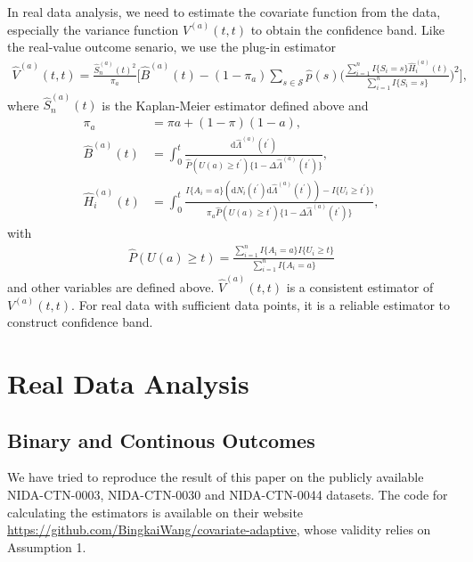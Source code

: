 \documentclass{article}
\begin{document}
In real data analysis, we need to estimate the covariate function from the data, especially the variance function $V^{(a)}(t,t)$ to obtain the confidence band. Like the real-value outcome senario, we use the plug-in estimator
\begin{align}
    \hat{V}^{(a)}(t,t)=\frac{\hat{S}_{n}^{(a)}(t)^2}{\pi_a}\Bigg[\hat{B}^{(a)}(t)-(1-\pi_a)\sum_{s\in\mathcal{S}}\hat{p}(s)\bigg(\frac{\sum_{i=1}^{n}I\{S_i=s\}\hat{H}_i^{(a)}(t)}{\sum_{i=1}^{n}I\{S_i=s\}}\bigg)^2\Bigg],\nonumber
\end{align}
where $\hat{S}_{n}^{(a)}(t)$ is the Kaplan-Meier estimator defined above and 
\begin{align}
    \pi_a&=\pi a + (1-\pi)(1-a),\nonumber\\
    \hat{B}^{(a)}(t)&=\int_{0}^{t}\frac{\mathrm{d}\hat{\Lambda}^{(a)}(t^{\prime})}{\hat{P}(U(a)\geq t^{\prime})\{1-\Delta\hat{\Lambda}^{(a)}(t^{\prime})\}},\nonumber\\
    \hat{H}_{i}^{(a)}(t)&=\int_{0}^{t}\frac{I\{A_i=a\}(\mathrm{d}N_i(t^{\prime})\mathrm{d}\hat{\Lambda}^{(a)}(t^{\prime}))-I\{U_i\geq t^{\prime}\})}{\pi_a\hat{P}(U(a)\geq t^{\prime})\{1-\Delta\hat{\Lambda}^{(a)}(t^{\prime})\}},\nonumber
\end{align}
with 
\begin{align}
    \hat{P}(U(a)\geq t) = \frac{\sum_{i=1}^{n}I\{A_i=a\}I\{U_i\geq t\}}{\sum_{i=1}^{n}I\{A_i=a\}}\nonumber
\end{align}
and other variables are defined above. $\hat{V}^{(a)}(t,t)$ is a consistent estimator of $V^{(a)}(t,t)$. For real data with sufficient data points, it is a reliable estimator to construct confidence band.

\section{Real Data Analysis}

\subsection{Binary and Continous Outcomes}

We have tried to reproduce the result of this paper on the publicly available NIDA-CTN-0003, NIDA-CTN-0030 and NIDA-CTN-0044 datasets. The code for calculating the estimators is available on their website \hyperlink{ https://github.com/BingkaiWang/covariate-adaptive}{https://github.com/BingkaiWang/covariate-adaptive}, whose validity relies on Assumption 1. 
\end{document}
